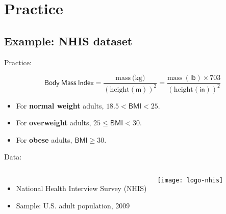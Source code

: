 \documentclass[t]{beamer}
\begin{document}
% 	
% 		
% 	

	\section{Practice}

	\subsection{Example: NHIS dataset}
	
	\begin{frame}[t]{Practice: }

		$$\mathsf{Body~Mass~Index} = \frac{\mbox{mass} \ \mbox{(kg)}}{\left( \mbox{height}(\mathsf{m})\right)^2} = \frac{\mbox{mass} \ \mathsf{(lb)} \times 703}{\left(\mbox{height} (\mathsf{in})\right)^2}$$
		
		\vspace{1em}

		\begin{itemize}
			\item For \textbf{normal weight} adults, $18.5 < \mathsf{BMI} < 25$.
			\item For \textbf{overweight} adults, $25 \leq \mathsf{BMI} < 30$.
			\item For \textbf{obese }adults, $\mathsf{BMI} \geq 30$.		
		\end{itemize}

		\vspace{1em}
		
    Data:
	
			\begin{columns}[c]
				
				\begin{itemize}
					\item National Health Interview Survey (NHIS)
					\item Sample: U.S. adult population, 2009
				\end{itemize}
	
				\texttt{[image: logo-nhis]}
			\end{columns}
	
	\end{frame}
	
\end{document}
